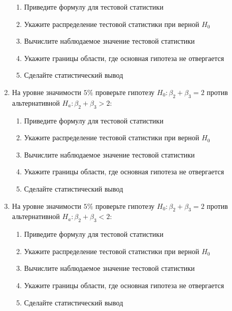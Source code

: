 \documentclass[pdftex,11pt,openany]{book}\usepackage[]{graphicx}\usepackage[]{color}
\begin{document}
\begin{problem}
\begin{enumerate}
\begin{enumerate}
\item Приведите формулу для тестовой статистики 
\item Укажите распределение тестовой статистики при верной $H_0$
\item Вычислите наблюдаемое значение тестовой статистики
\item Укажите границы области, где основная гипотеза не отвергается
\item Сделайте статистический вывод
\end{enumerate}
\item На уровне значимости $5\%$ проверьте гипотезу  $H_0: \beta_2 + \beta_3 = 2$ против альтернативной $H_a: \beta_2 + \beta_3 > 2$:
\begin{enumerate}
\item Приведите формулу для тестовой статистики 
\item Укажите распределение тестовой статистики при верной $H_0$
\item Вычислите наблюдаемое значение тестовой статистики
\item Укажите границы области, где основная гипотеза не отвергается
\item Сделайте статистический вывод
\end{enumerate}
\item На уровне значимости $5\%$ проверьте гипотезу  $H_0: \beta_2 + \beta_3 = 2$ против альтернативной $H_a: \beta_2 + \beta_3 < 2$:
\begin{enumerate}
\item Приведите формулу для тестовой статистики 
\item Укажите распределение тестовой статистики при верной $H_0$
\item Вычислите наблюдаемое значение тестовой статистики
\item Укажите границы области, где основная гипотеза не отвергается
\item Сделайте статистический вывод
\end{enumerate}
\end{enumerate}
\end{problem}
\end{document}
